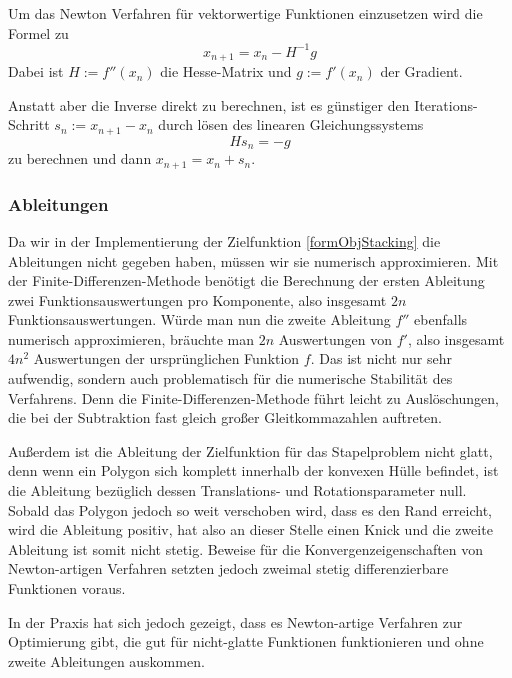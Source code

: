 \documentclass[runningheads,a4paper]{llncs}
\begin{document}
Um das Newton Verfahren für vektorwertige Funktionen einzusetzen wird die Formel zu
\begin{equation}
\label{eq:ndimnewtonstep}
x_{n+1} = x_n - H^{-1}g
\end{equation}
Dabei ist $H := f''(x_n)$ die Hesse-Matrix und $g := f'(x_n)$ der Gradient.

Anstatt aber die Inverse direkt zu berechnen, ist es günstiger den Iterations-Schritt ${s_n := x_{n+1} - x_n}$ durch lösen des linearen Gleichungssystems
\begin{equation}
\label{eq:newtonlineq}
Hs_n=-g
\end{equation}
zu berechnen und dann ${x_{n+1} = x_n + s_n}$.


\subsubsection{Ableitungen}

Da wir in der Implementierung der Zielfunktion \ref{formObjStacking} die Ableitungen nicht gegeben haben, müssen wir sie numerisch approximieren. Mit der Finite-Differenzen-Methode benötigt die Berechnung der ersten Ableitung zwei Funktionsauswertungen pro Komponente, also insgesamt $2n$ Funktionsauswertungen. Würde man nun die zweite Ableitung $f''$ ebenfalls numerisch approximieren, bräuchte man $2n$ Auswertungen von $f'$, also insgesamt $4n^2$ Auswertungen der ursprünglichen Funktion $f$. Das ist nicht nur sehr aufwendig, sondern auch problematisch für die numerische Stabilität des Verfahrens. Denn die Finite-Differenzen-Methode führt leicht zu Auslöschungen, die bei der Subtraktion fast gleich großer Gleitkommazahlen auftreten.

Außerdem ist die Ableitung der Zielfunktion für das Stapelproblem nicht glatt, denn wenn ein Polygon sich komplett innerhalb der konvexen Hülle befindet, ist die Ableitung bezüglich dessen Translations- und Rotationsparameter null. Sobald das Polygon jedoch so weit verschoben wird, dass es den Rand erreicht, wird die Ableitung positiv, hat also an dieser Stelle einen Knick und die zweite Ableitung ist somit nicht stetig. Beweise für die Konvergenzeigenschaften von Newton-artigen Verfahren setzten jedoch zweimal stetig differenzierbare Funktionen voraus.

In der Praxis hat sich jedoch gezeigt, dass es Newton-artige Verfahren zur Optimierung gibt, die gut für nicht-glatte Funktionen funktionieren \cite{DBLP:journals/mp/LewisO13} und ohne zweite Ableitungen auskommen.
\end{document}

